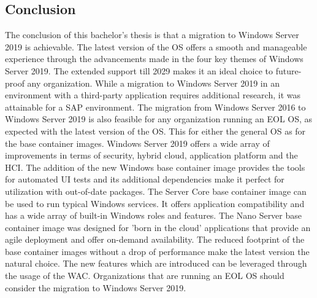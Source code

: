 \documentclass[a0,portrait]{a0poster}
\begin{document}
\begin{multicols}{2}
\section*{Conclusion}
\color{black}
The conclusion of this bachelor's thesis is that a migration to Windows Server 2019 is achievable.
The latest version of the OS offers a smooth and manageable experience through the advancements made in the four key themes of Windows Server 2019. 
The extended support till 2029 makes it an ideal choice to future-proof any organization. 
While a migration to Windows Server 2019 in an environment with a third-party application requires additional research, it was attainable for a SAP environment. 
The migration from Windows Server 2016 to Windows Server 2019 is also feasible for any organization running an EOL OS, as expected with the latest version of the OS.
This for either the general OS as for the base container images.
Windows Server 2019 offers a wide array of improvements in terms of security, hybrid cloud, application platform and the HCI.
The addition of the new Windows base container image provides the tools for automated UI tests and its additional dependencies make it perfect for utilization with out-of-date packages. 
The Server Core base container image can be used to run typical Windows services. 
It offers application compatibility and has a wide array of built-in Windows roles and features. 
The Nano Server base container image was designed for 'born in the cloud' applications that provide an agile deployment and offer on-demand availability. 
The reduced footprint of the base container images without a drop of performance make the latest version the natural choice. 
The new features which are introduced can be leveraged through the usage of the WAC.
Organizations that are running an EOL OS should consider the migration to Windows Server 2019.
\color{HoGentAccent1} 

\end{multicols}
\end{document}
